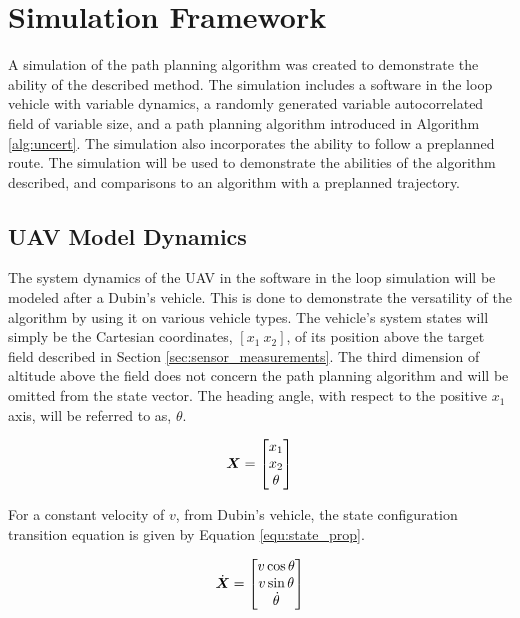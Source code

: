 \chapter{Simulation Framework}
A simulation of the path planning algorithm was created to demonstrate the ability of the described method. The simulation includes a software in the loop vehicle with variable dynamics, a randomly generated variable autocorrelated field of variable size, and a path planning algorithm introduced in Algorithm \ref{alg:uncert}. The simulation also incorporates the ability to follow a preplanned route. The simulation will be used to demonstrate the abilities of the algorithm described, and comparisons to an algorithm with a preplanned trajectory. 

\section{UAV Model Dynamics}
The system dynamics of the UAV in the software in the loop simulation will be modeled after a Dubin's vehicle. This is done to demonstrate the versatility of the algorithm by using it on various vehicle types. The vehicle's system states will simply be the Cartesian coordinates, $[x_1\ x_2]$, of its position above the target field described in Section \ref{sec:sensor_measurements}. The third dimension of altitude above the field does not concern the path planning algorithm and will be omitted from the state vector. The heading angle, with respect to the positive $x_1$ axis, will be referred to as, $\theta$.

\begin{equation}
\label{equ:state_vector}
{\it{\boldsymbol{X}}} = \begin{bmatrix} 
			x_1 \\
			x_2 \\
			\theta
			\end{bmatrix}
\end{equation}

For a constant velocity of $v$, from Dubin's vehicle, the state configuration transition equation is given by Equation \ref{equ:state_prop}.

\begin{equation}
\label{equ:state_prop}
\dot{{\it{\boldsymbol{X}}}} = \begin{bmatrix} 
			v \cos\theta \\
			v \sin\theta \\
			\dot{\theta}
			\end{bmatrix}
\end{equation}


